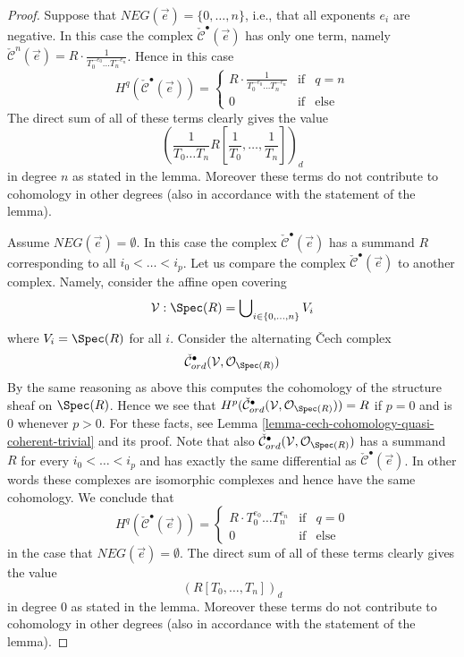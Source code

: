 \begin{proof}
\medskip\noindent
Suppose that $NEG(\vec{e}) = \{0, \ldots, n\}$, i.e., that all
exponents $e_i$ are negative.
In this case the complex $\check{\mathcal{C}}^\bullet(\vec{e})$ has
only one term, namely $\check{\mathcal{C}}^n(\vec{e}) =
R \cdot \frac{1}{T_0^{-e_0} \ldots T_n^{-e_n}}$. Hence in this
case
$$
H^q(\check{\mathcal{C}}^\bullet(\vec{e})) =
\left\{
\begin{matrix}
R \cdot \frac{1}{T_0^{-e_0} \ldots T_n^{-e_n}} & \text{if} & q = n \\
0 & \text{if} & \text{else}
\end{matrix}
\right.
$$
The direct sum of all of these terms clearly gives the value
$$
\left(\frac{1}{T_0 \ldots T_n} R[\frac{1}{T_0}, \ldots, \frac{1}{T_n}]\right)_d
$$
in degree $n$ as stated in the lemma. Moreover these terms do not contribute
to cohomology in other degrees (also in accordance with the statement of the
lemma).

\medskip\noindent
Assume $NEG(\vec{e}) = \emptyset$. In this case the complex
$\check{\mathcal{C}}^\bullet(\vec{e})$ has a summand $R$ corresponding
to all $i_0 < \ldots < i_p$.
Let us compare the complex $\check{\mathcal{C}}^\bullet(\vec{e})$
to another complex. Namely, consider the affine open covering
$$
\mathcal{V} : \Spec(R) = \bigcup\nolimits_{i \in \{0, \ldots, n\}} V_i
$$
where $V_i = \Spec(R)$ for all $i$. Consider the alternating
{\v C}ech complex
$$
\check{\mathcal{C}}_{ord}^\bullet(\mathcal{V}, \mathcal{O}_{\Spec(R)})
$$
By the same reasoning as above this computes the cohomology of the
structure sheaf on $\Spec(R)$. Hence we see that
$H^p(
\check{\mathcal{C}}_{ord}^\bullet(\mathcal{V}, \mathcal{O}_{\Spec(R)})
) = R$ if $p = 0$ and is $0$ whenever $p > 0$.
For these facts, see
Lemma \ref{lemma-cech-cohomology-quasi-coherent-trivial} and its proof.
Note that also
$\check{\mathcal{C}}_{ord}^\bullet(\mathcal{V}, \mathcal{O}_{\Spec(R)})$
has a summand $R$ for every $i_0 < \ldots < i_p$ and has exactly the same
differential as $\check{\mathcal{C}}^\bullet(\vec{e})$. In other words
these complexes are isomorphic complexes and hence have the same cohomology.
We conclude that
$$
H^q(\check{\mathcal{C}}^\bullet(\vec{e})) =
\left\{
\begin{matrix}
R \cdot T_0^{e_0} \ldots T_n^{e_n} & \text{if} & q = 0 \\
0 & \text{if} & \text{else}
\end{matrix}
\right.
$$
in the case that $NEG(\vec{e}) = \emptyset$.
The direct sum of all of these terms clearly gives the value
$$
(R[T_0, \ldots, T_n])_d
$$
in degree $0$ as stated in the lemma. Moreover these terms do not contribute
to cohomology in other degrees (also in accordance with the statement of the
lemma).


\end{proof}
